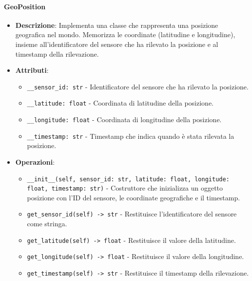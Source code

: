 \documentclass[10pt]{article}
\begin{document}
    \paragraph{GeoPosition}
    \begin{itemize} 
    \item \textbf{Descrizione}: Implementa una classe che rappresenta una posizione geografica nel mondo. Memorizza le coordinate (latitudine e longitudine), insieme all'identificatore del sensore che ha rilevato la posizione e al timestamp della rilevazione.
    \item \textbf{Attributi}:
    \begin{itemize}
        \item \texttt{\_\_sensor\_id: str} - Identificatore del sensore che ha rilevato la posizione.
        \item \texttt{\_\_latitude: float} - Coordinata di latitudine della posizione.
        \item \texttt{\_\_longitude: float} - Coordinata di longitudine della posizione.
        \item \texttt{\_\_timestamp: str} - Timestamp che indica quando è stata rilevata la posizione.
    \end{itemize}
    
    \item \textbf{Operazioni}:
    \begin{itemize}
        \item \texttt{\_\_init\_\_(self, sensor\_id: str, latitude: float, longitude: float, timestamp: str)} - Costruttore che inizializza un oggetto posizione con l'ID del sensore, le coordinate geografiche e il timestamp.
        
        \item \texttt{get\_sensor\_id(self) -> str} - Restituisce l'identificatore del sensore come stringa.
        
        \item \texttt{get\_latitude(self) -> float} - Restituisce il valore della latitudine.
        
        \item \texttt{get\_longitude(self) -> float} - Restituisce il valore della longitudine.
        
        \item \texttt{get\_timestamp(self) -> str} - Restituisce il timestamp della rilevazione.
    \end{itemize}
    \end{itemize}
\end{document}
